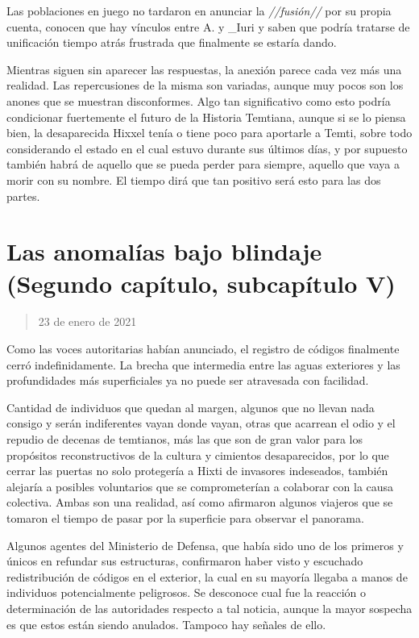 \documentclass[
  spanish,
]{book}
\begin{document}
Las poblaciones en juego no tardaron en anunciar la \emph{//fusión//} por su propia cuenta, conocen que hay vínculos entre A. y \_Iuri y saben que podría tratarse de unificación tiempo atrás frustrada que finalmente se estaría dando.

Mientras siguen sin aparecer las respuestas, la anexión parece cada vez más una realidad. Las repercusiones de la misma son variadas, aunque muy pocos son los anones que se muestran disconformes. Algo tan significativo como esto podría condicionar fuertemente el futuro de la Historia Temtiana, aunque si se lo piensa bien, la desaparecida Hixxel tenía o tiene poco para aportarle a Temti, sobre todo considerando el estado en el cual estuvo durante sus últimos días, y por supuesto también habrá de aquello que se pueda perder para siempre, aquello que vaya a morir con su nombre. El tiempo dirá que tan positivo será esto para las dos partes.

\hypertarget{las-anomaluxedas-bajo-blindaje-segundo-capuxedtulo-subcapuxedtulo-v}{%
\section{Las anomalías bajo blindaje (Segundo capítulo, subcapítulo V)}\label{las-anomaluxedas-bajo-blindaje-segundo-capuxedtulo-subcapuxedtulo-v}}

\begin{quote}
23 de enero de 2021
\end{quote}

Como las voces autoritarias habían anunciado, el registro de códigos finalmente cerró indefinidamente. La brecha que intermedia entre las aguas exteriores y las profundidades más superficiales ya no puede ser atravesada con facilidad.

Cantidad de individuos que quedan al margen, algunos que no llevan nada consigo y serán indiferentes vayan donde vayan, otras que acarrean el odio y el repudio de decenas de temtianos, más las que son de gran valor para los propósitos reconstructivos de la cultura y cimientos desaparecidos, por lo que cerrar las puertas no solo protegería a Hixti de invasores indeseados, también alejaría a posibles voluntarios que se comprometerían a colaborar con la causa colectiva. Ambas son una realidad, así como afirmaron algunos viajeros que se tomaron el tiempo de pasar por la superficie para observar el panorama.

Algunos agentes del Ministerio de Defensa, que había sido uno de los primeros y únicos en refundar sus estructuras, confirmaron haber visto y escuchado redistribución de códigos en el exterior, la cual en su mayoría llegaba a manos de individuos potencialmente peligrosos. Se desconoce cual fue la reacción o determinación de las autoridades respecto a tal noticia, aunque la mayor sospecha es que estos están siendo anulados. Tampoco hay señales de ello.
\end{document}
